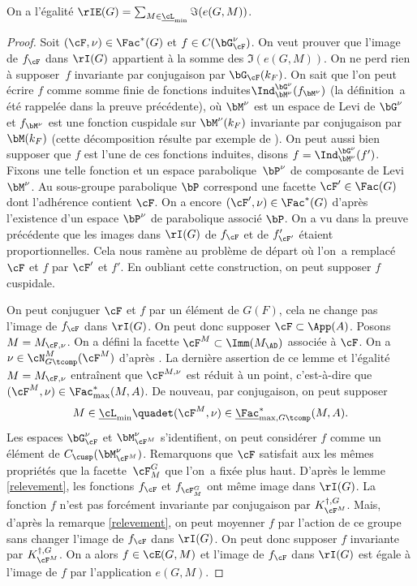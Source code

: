 \begin{lem*}
On a l'égalité $\rIE(G)=\sum_{M\in \underline{\cL}_{\min}}\Im(e(G,M))$.
\end{lem*}

\begin{proof}
Soit $(\cF,\nu)\in \Fac^*(G)$ et $f\in C(\bG_{\cF}^{\nu})$. On veut prouver que l'image de $f_{\cF}$ dans $\rI(G)$ appartient à la somme des $\Im(e(G,M))$. On ne perd rien à supposer~$f$ invariante par conjugaison par $\bG_{\cF}(k_{F})$. On sait que l'on peut écrire $f$ comme somme finie de fonctions \og induites\fg $\Ind_{\bM^{\nu}}^{\bG^{\nu}}(f_{\bM^{\nu}})$ (la définition~a été rappelée dans la preuve précédente), où $\bM^{\nu}$ est un espace de Levi de $\bG^{\nu}$ et $f_{\bM^{\nu}}$ est une fonction cuspidale sur $\bM^{\nu}(k_{F})$ invariante par conjugaison par $\bM(k_{F})$ (cette décomposition résulte par exemple de \cite[Th.\,2.11]{A}). On peut aussi bien supposer que $f$ est l'une de ces fonctions induites, disons $f=\Ind_{\bM^{\nu}}^{\bG^{\nu}}(f')$. Fixons une telle fonction et un espace parabolique~$\bP^{\nu}$ de composante de Levi $\bM^{\nu}$. Au sous-groupe parabolique $\bP$ correspond une facette $\cF'\in \Fac(G)$ dont l'adhérence contient $\cF$. On a encore $(\cF',\nu)\in \Fac^*(G)$ d'après l'existence d'un espace $\bP^{\nu}$ de parabolique associé $\bP$. On a vu dans la preuve précédente que les images dans $\rI(G)$ de $f_{\cF}$ et de $f'_{\cF'}$ étaient proportionnelles.
Cela nous ramène au problème de départ où l'on~a remplacé $\cF$ et $f$ par $\cF'$ et $f'$. En oubliant cette construction, on peut supposer $f$ cuspidale.

On peut conjuguer $\cF$ et $f$ par un élément de $G(F)$, cela ne change pas l'image de $f_{\cF}$ dans $\rI(G)$. On peut donc supposer $\cF\subset \App(A)$. Posons $M=M_{\cF,\nu}$. On a défini la facette $\cF^M\subset \Imm(M_{\AD})$ associée à $\cF$. On a $\nu\in \cN_{G\tcomp}^M(\cF^M)$ d'après \cite[Lem.\,6(i)]{W2}. La dernière assertion de ce lemme et l'égalité $M=M_{\cF,\nu}$ entraînent que $\cF^{M,\nu}$ est réduit à un point, c'est-à-dire que $(\cF^M,\nu)\in \Fac^*_{\max}(M,A)$. De nouveau, par conjugaison, on peut supposer
\[
M\in \underline{\cL}_{\min}\quadet (\cF^M,\nu)\in \underline{\Fac}^*_{\max,G\tcomp}(M,A).
\]
Les espaces $\bG_{\cF}^{\nu}$ et $\bM_{\cF^M}^{\nu}$ s'identifient, on peut considérer $f$ comme un élément de $C_{\cusp}(\bM_{\cF^M}^{\nu})$. Remarquons que $\cF$ satisfait aux les mêmes propriétés que la facette~$\cF_{M}^G$ que l'on~a fixée plus haut. D'après le lemme \ref{relevement}, les fonctions $f_{\cF}$ et $f_{\cF_{M}^G}$ ont même image dans $\rI(G)$. La fonction $f$ n'est pas forcément invariante par
conjugaison par $K_{\cF^M}^{\dag,G}$. Mais, d'après la remarque \ref{relevement}, on peut moyenner $f$ par l'action de ce groupe sans changer l'image de $f_{\cF}$ dans $\rI(G)$. On peut donc supposer $f$ invariante par $K_{\cF^M}^{\dag,G}$. On a alors $f\in \cE(G,M)$ et l'image de $f_{\cF}$ dans $\rI(G)$ est égale à l'image de $f$ par l'application $e(G,M)$.
\end{proof}

